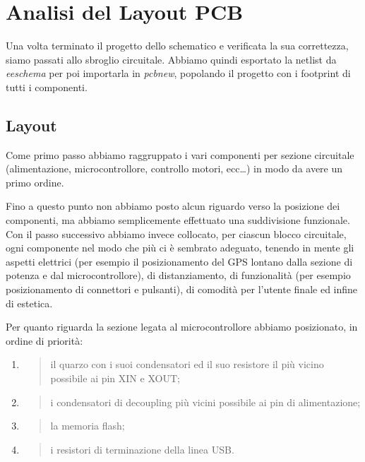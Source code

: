 \chapter{Analisi del Layout PCB}

Una volta terminato il progetto dello schematico e verificata la sua
correttezza, siamo passati allo sbroglio circuitale. Abbiamo quindi
esportato la netlist da \emph{eeschema} per poi importarla in
\emph{pcbnew}, popolando il progetto con i footprint di tutti i
componenti.

\hypertarget{layout}{%
\section{Layout}\label{layout}}

Come primo passo abbiamo raggruppato i vari componenti per sezione
circuitale (alimentazione, microcontrollore, controllo motori,
ecc\ldots) in modo da avere un primo ordine.

Fino a questo punto non abbiamo posto alcun riguardo verso la posizione
dei componenti, ma abbiamo semplicemente effettuato una suddivisione
funzionale. Con il passo successivo abbiamo invece collocato, per
ciascun blocco circuitale, ogni componente nel modo che più ci è
sembrato adeguato, tenendo in mente gli aspetti elettrici (per esempio
il posizionamento del GPS lontano dalla sezione di potenza e dal
microcontrollore), di distanziamento, di funzionalità (per esempio
posizionamento di connettori e pulsanti), di comodità per l'utente
finale ed infine di estetica.

Per quanto riguarda la sezione legata al microcontrollore abbiamo
posizionato, in ordine di priorità:

\begin{enumerate}
\def\labelenumi{\arabic{enumi}.}
\item
  \begin{quote}
  il quarzo con i suoi condensatori ed il suo resistore il più vicino
  possibile ai pin XIN e XOUT;
  \end{quote}
\item
  \begin{quote}
  i condensatori di decoupling più vicini possibile ai pin di
  alimentazione;
  \end{quote}
\item
  \begin{quote}
  la memoria flash;
  \end{quote}
\item
  \begin{quote}
  i resistori di terminazione della linea USB.
  \end{quote}
\end{enumerate}

